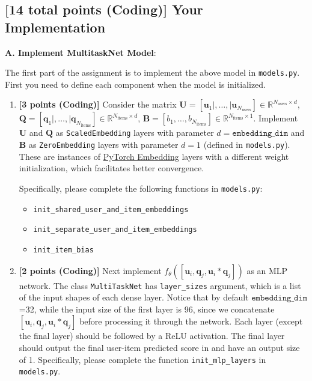\documentclass[12pt]{article}
\begin{document}
\vspace{0.2cm}

\subsection{\textbf{[14 total points (Coding)]} Your Implementation}
\noindent \noindent\textbf{A. Implement MultitaskNet Model}: 

\noindent The first part of the assignment is to implement the above model in \texttt{models.py}. First you need to define each component when the model is initialized. 

\begin{enumerate}
    \item \textbf{[3 points (Coding)]} Consider the matrix $\mathbf{U} = [\mathbf{u}_1|,\ldots,|\mathbf{u}_{N_{\text{users}}}]\in\mathbb{R}^{N_{\text{users}}\times d}$, $\mathbf{Q} = [\mathbf{q}_1|,\ldots,|\mathbf{q}_{N_{\text{items}}}]\in\mathbb{R}^{N_{\text{items}}\times d}$, $\mathbf{B} = [b_1, \ldots, b_{N_{\text{items}}}]\in \mathbb{R}^{N_{\text{items}}\times 1}$. Implement $\mathbf{U}$ and $\mathbf{Q}$ as \texttt{ScaledEmbedding} layers  with parameter $d=\texttt{embedding\_dim}$ and $\mathbf{B}$ as \texttt{ZeroEmbedding} layers with parameter $d=1$ (defined in \texttt{models.py}). These are instances of \href{https://pytorch.org/docs/stable/generated/torch.nn.Embedding.html}{PyTorch Embedding} layers with a different weight initialization, which facilitates better convergence.

    Specifically, please complete the following functions in \texttt{models.py}:
    \begin{itemize}
        \item \texttt{init\_shared\_user\_and\_item\_embeddings}
        \item \texttt{init\_separate\_user\_and\_item\_embeddings}
        \item \texttt{init\_item\_bias}
    \end{itemize}
    
    \item \textbf{[2 points (Coding)]} Next implement $f_{\theta}([\mathbf{u}_i, \mathbf{q}_j, \mathbf{u}_i * \mathbf{q}_j])$ as an MLP network. The class \texttt{MultiTaskNet} has \texttt{layer\_sizes} argument, which is a list of the input shapes of each dense layer. Notice that by default $\texttt{embedding\_dim}$=32, while the input size of the first layer is 96, since we concatenate $[\mathbf{u}_i, \mathbf{q}_j, \mathbf{u}_i * \mathbf{q}_j]$ before processing it through the network. Each layer (except the final layer) should be followed by a ReLU activation. The final layer should output the final user-item predicted score in and have an output size of 1. 
     Specifically, please complete the function \texttt{init\_mlp\_layers} in \texttt{models.py}.
\end{enumerate}
\end{document}
